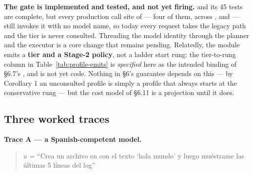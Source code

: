 \textbf{The gate is implemented and tested, and not yet firing.}
 and its 45 tests are complete, but every
production call site of  --- four of them, across
,  and
 --- still invokes it with no model name, so today every
request takes the legacy path and the tier is never consulted. Threading the
model identity through the planner and the executor is a core change that
remains pending. Relatedly, the module emits a \textbf{tier and a Stage-2
policy}, not a ladder start rung: the tier-to-rung column in
Table~\ref{tab:profile-emits} is \emph{specified} here as the intended binding
of \S6.7's , and is not yet code. Nothing in \S6's
guarantee depends on this --- by Corollary 1 an unconsulted profile is simply a
profile that always starts at the conservative rung --- but the cost model of
\S6.11 is a projection until it does.

\subsection{Three worked traces}
\label{sec:three-worked-traces}

\textbf{Trace A --- a Spanish-competent model.}

\begin{quote}
$u$ = \foreignlanguage{spanish}{``Crea un archivo en
 con el
texto `hola mundo' y luego muéstrame las últimas 5 líneas del log''}
\end{quote}

